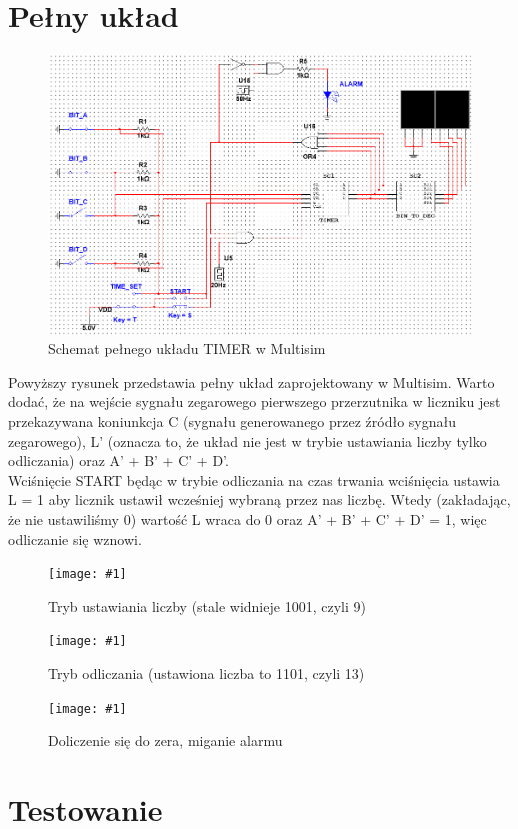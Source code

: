 \documentclass{article}
\newcommand{\image}[3]{
    \begin{figure}[H]
        \centering
        \captionsetup{font=small, skip=2pt}
        \texttt{[image: \#1]}
        \caption{#2}
    \end{figure}
}
\begin{document}
    \section{Pełny układ}
    \begin{figure}[H]
        \centering
        \captionsetup{font=small, skip=2pt}
        \includegraphics[scale=0.7]{images/pelny_timer}
        \caption{Schemat pełnego układu TIMER w Multisim}
    \end{figure}
    Powyższy rysunek przedstawia pełny układ zaprojektowany w Multisim. Warto dodać, że na wejście
    sygnału zegarowego pierwszego przerzutnika w liczniku jest przekazywana koniunkcja C (sygnału generowanego
    przez źródło sygnału zegarowego), L' (oznacza to, że układ nie jest w trybie ustawiania liczby tylko odliczania) oraz
    A' + B' + C' + D'. \\
    
    Wciśnięcie START będąc w trybie odliczania na czas trwania wciśnięcia ustawia L = 1 aby licznik ustawił wcześniej wybraną
    przez nas liczbę. Wtedy (zakładając, że nie ustawiliśmy 0) wartość L wraca do 0 oraz A' + B' + C' + D' = 1, więc odliczanie się wznowi.

    \image{images/ustawianie_liczby}{Tryb ustawiania liczby (stale widnieje 1001, czyli 9)}{scale=0.8}
    \image{images/odliczanie}{Tryb odliczania (ustawiona liczba to 1101, czyli 13)}{scale=0.8}
    \image{images/zero}{Doliczenie się do zera, miganie alarmu}{scale=0.8}

    \section{Testowanie}
\end{document}

